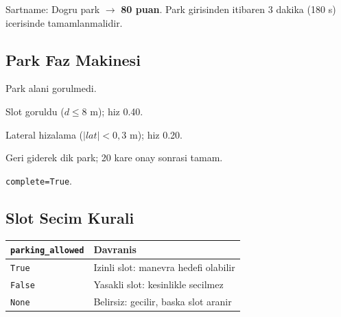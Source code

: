 \documentclass[a4paper,12pt]{article}
\begin{document}
\begin{specbox}
Sartname: Dogru park $\to$ \textbf{80 puan}. Park girisinden
itibaren 3 dakika (180 s) icerisinde tamamlanmalidir.
\end{specbox}

\subsection{Park Faz Makinesi}

\begin{center}
\end{center}

\begin{description}[leftmargin=2em]
  \item[bekleme] Park alani gorulmedi.
  \item[yaklasma] Slot goruldu ($d \leq 8$ m); hiz 0.40.
  \item[konumlanma] Lateral hizalama ($|lat| < 0{,}3$ m); hiz 0.20.
  \item[manevra] Geri giderek dik park; 20 kare onay sonrasi tamam.
  \item[park\_edildi] \texttt{complete=True}.
\end{description}

\subsection{Slot Secim Kurali}

\begin{center}
\begin{tabular}{ll}
  \toprule
  \texttt{parking\_allowed} & Davranis\\
  \midrule
  \texttt{True}  & Izinli slot: manevra hedefi olabilir\\
  \texttt{False} & Yasakli slot: kesinlikle secilmez\\
  \texttt{None}  & Belirsiz: gecilir, baska slot aranir\\
  \bottomrule
\end{tabular}
\end{center}
\end{document}
